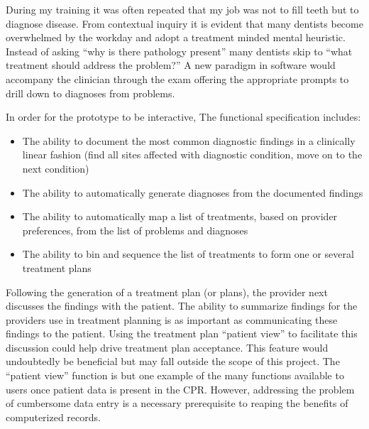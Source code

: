 \documentclass[11pt]{article}
\begin{document}
During my training it was often repeated that my job was not to fill teeth but to diagnose disease. From contextual inquiry it is evident that many dentists become overwhelmed by the workday and adopt a treatment minded mental heuristic. Instead of asking ``why is there pathology present'' many dentists skip to ``what treatment should address the problem?'' A new paradigm in software would accompany the clinician through the exam offering the appropriate prompts to drill down to diagnoses from problems.


In order for the prototype to be interactive, The functional specification includes:

\begin{itemize}
\item The ability to document the most common diagnostic findings in a clinically linear fashion (find all sites affected with diagnostic condition, move on to the next condition)
\item The ability to automatically generate diagnoses from the documented findings
\item The ability to automatically map a list of treatments, based on provider preferences, from the list of problems and diagnoses
\item The ability to bin and sequence the list of treatments to form one or several treatment plans
\end{itemize}

Following the generation of a treatment plan (or plans), the provider next discusses the findings with the patient. The ability to summarize findings for the providers use in treatment planning is as important as communicating these findings to the patient. Using the treatment plan ``patient view'' to facilitate this discussion could help drive treatment plan acceptance. This feature would undoubtedly be beneficial but may fall outside the scope of this project. The ``patient view'' function is but one example of the many functions available to users once patient data is present in the CPR. However, addressing the problem of cumbersome data entry is a necessary prerequisite to reaping the benefits of computerized records.
\end{document}
